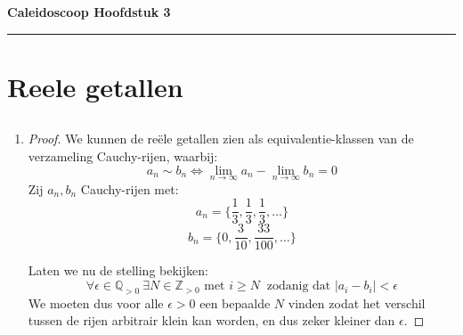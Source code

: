 \documentclass{article}
\newcommand{\Zg}{\mathbb{Z}_{> 0}}
\newcommand{\Q}{\mathbb{Q}}
\newcommand{\tx}[1]{\text{#1}}
\newcommand{\f}[2]{\frac{#1}{#2}}
\newcommand{\lm}[1]{\lim_{n \rightarrow \infty} #1}
\begin{document}
\begin{center}
    \Large \textbf{Caleidoscoop Hoofdstuk 3}
\end{center}

\rule{\textwidth}{2pt}

\bigskip

\section{Reele getallen}

\subsection{}
\begin{enumerate}[label=\alph*)]
    \item
          \begin{proof}
              We kunnen de reële
              getallen zien als equivalentie-klassen van
              de verzameling Cauchy-rijen, waarbij:
              \[a_n \sim b_n \iff \lm{a_n} - \lm{b_n} = 0\]
              Zij $a_n, b_n$ Cauchy-rijen met:
              \[a_n = \{\f{1}{3}, \f{1}{3}, \f{1}{3}, \dots \}\]
              \[b_n = \{0, \f{3}{10}, \f{33}{100}, \dots \}\]

              Laten we nu de stelling bekijken:
              \[\forall \epsilon \in \Q_{>0} \
                  \exists N \in \Zg \tx{ met }
                  i \geq N\ \tx{ zodanig dat }
                  |a_i - b_i| < \epsilon\]
              We moeten dus voor alle $\epsilon>0$
              een bepaalde $N$ vinden
              zodat het verschil tussen de
              rijen arbitrair klein kan worden,
              en dus zeker kleiner dan $\epsilon$.


\end{proof}
\end{enumerate}
\end{document}
